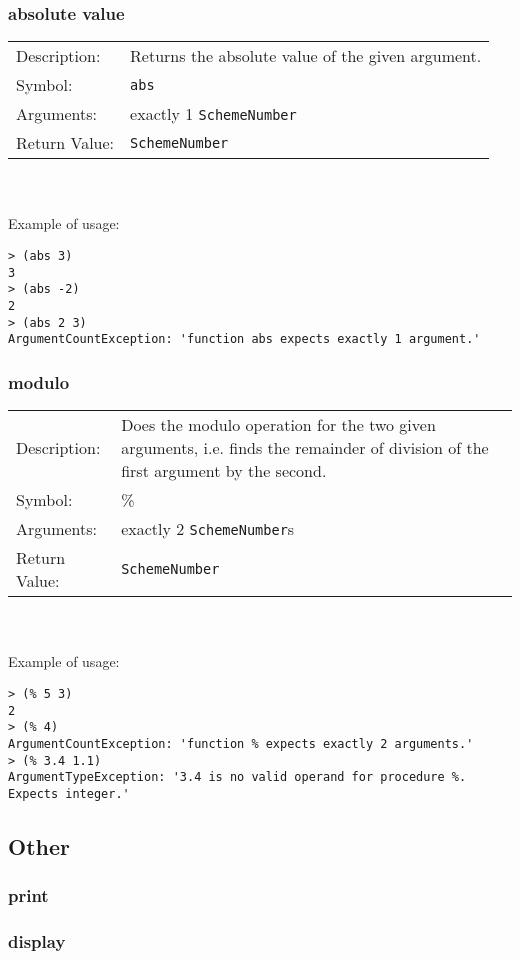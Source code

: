 \documentclass[12pt,a4paper]{scrartcl}
\begin{document}
\subsubsection*{absolute value}
\begin{tabular}{l  p{13cm}}
Description: & Returns the absolute value of the given argument.\\
Symbol: & \lstinline{abs}\\
Arguments: & exactly 1 \lstinline{SchemeNumber}\\
Return Value: & \lstinline{SchemeNumber}
\end{tabular}
\\
\\
Example of usage:
\begin{lstlisting}
> (abs 3)
3
> (abs -2)
2
> (abs 2 3)
ArgumentCountException: 'function abs expects exactly 1 argument.'
\end{lstlisting}

\subsubsection*{modulo}
\begin{tabular}{l  p{13cm}}
Description: & Does the modulo operation for the two given arguments, i.e. finds the remainder of division of the first argument by the second.\\
Symbol: & \%\\
Arguments: & exactly 2 \lstinline{SchemeNumber}s\\
Return Value: & \lstinline{SchemeNumber}
\end{tabular}
\\
\\
Example of usage:
\begin{lstlisting}
> (% 5 3)
2
> (% 4)
ArgumentCountException: 'function % expects exactly 2 arguments.'
> (% 3.4 1.1)
ArgumentTypeException: '3.4 is no valid operand for procedure %. Expects integer.' 
\end{lstlisting}

\subsection*{Other}
\subsubsection*{print}
\subsubsection*{display}
\end{document}
